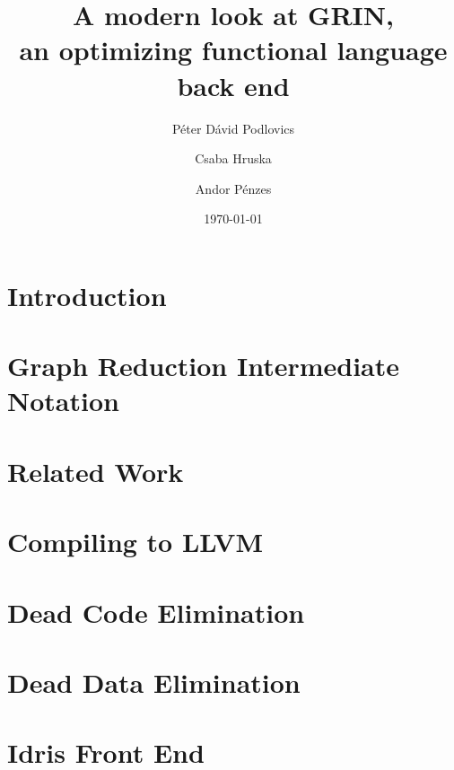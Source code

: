 \documentclass[10pt,a4paper,oneside]{article}
\begin{document}
	
	\title{A modern look at GRIN,\\ an optimizing functional language back end}
	

	\date{\today}
	\author
	{ 
		Péter Dávid Podlovics \and%
		Csaba Hruska \and %
		Andor Pénzes%
	}
	
	\maketitle
	
	
	\section{Introduction} \label{sec:intro}
	
	
	\section{Graph Reduction Intermediate Notation}
	
	
	\section{Related Work}
	
	
	\section{Compiling to LLVM}
	
	
	\section{Dead Code Elimination}
	
	
	\section{Dead Data Elimination} \label{sec:dde}
	
	
	\section{Idris Front End} \label{sec:idris-front-end}
	
	
\end{document}
